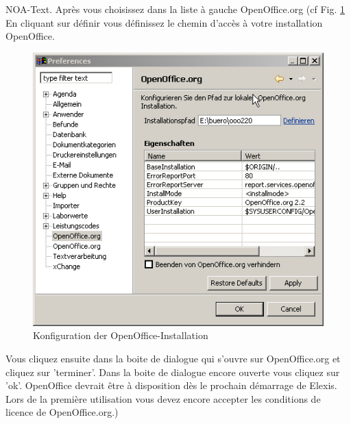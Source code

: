 NOA-Text\grqq{}. Après vous choisissez dans la liste à gauche OpenOffice.org (cf Fig. \ref{fig:text2}
En cliquant sur \glqq définir\grqq{} vous définissez le chemin d'accès à votre installation OpenOffice.
\begin{figure}[htp]
\begin{center}
  \includegraphics{images/text2}
  \caption{Konfiguration der OpenOffice-Installation}
  \label{fig:text2}
\end{center}
\end{figure}
Vous cliquez ensuite dans la boite de dialogue qui s'ouvre sur OpenOffice.org et cliquez sur 'terminer'.
Dans la boite de dialogue encore ouverte vous cliquez sur 'ok'. OpenOffice devrait être à disposition dès le prochain démarrage de Elexis. Lors de la première utilisation vous devez encore accepter les conditions de licence de OpenOffice.org.)



